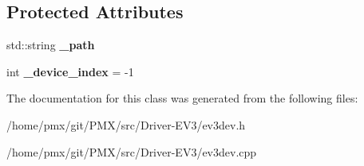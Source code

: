 \subsection*{Protected Attributes}
\begin{DoxyCompactItemize}
\item 
\mbox{\label{classev3dev_1_1device_ac8dc4772d64f02b6222df1fb3c9af62c}} 
std\+::string {\bfseries \+\_\+path}
\item 
\mbox{\label{classev3dev_1_1device_aa6ed4190ce90ced90d501623f652346f}} 
int {\bfseries \+\_\+device\+\_\+index} = -\/1
\end{DoxyCompactItemize}


The documentation for this class was generated from the following files\+:\begin{DoxyCompactItemize}
\item 
/home/pmx/git/\+P\+M\+X/src/\+Driver-\/\+E\+V3/ev3dev.\+h\item 
/home/pmx/git/\+P\+M\+X/src/\+Driver-\/\+E\+V3/ev3dev.\+cpp\end{DoxyCompactItemize}
